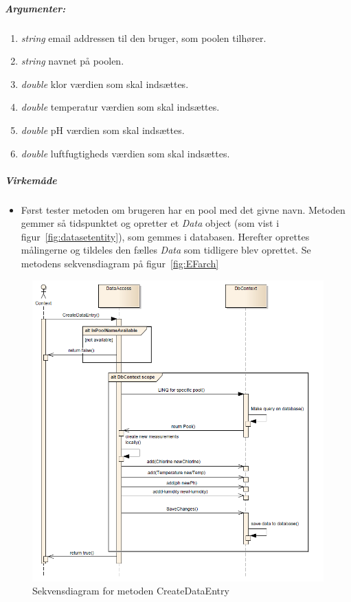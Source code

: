 \subparagraph{Argumenter:}
\begin{enumerate}
	\item \textit{string} email addressen til den bruger, som poolen tilhører.
	\item \textit{string} navnet på poolen.
	\item \textit{double} klor værdien som skal indsættes.
	\item \textit{double} temperatur værdien som skal indsættes.
	\item \textit{double} pH værdien som skal indsættes.
	\item \textit{double} luftfugtigheds værdien som skal indsættes.
\end{enumerate}

\subparagraph{Virkemåde}

\begin{itemize}
	\item Først tester metoden om brugeren har en pool med det givne navn. Metoden gemmer så tidspunktet og opretter et \textit{Data} object (som vist i figur~\ref{fig:datasetentity}), som gemmes i databasen. Herefter oprettes målingerne og tildeles den fælles \textit{Data} som tidligere blev oprettet. Se metodens sekvensdiagram på figur~\ref{fig:EFarch}
\end{itemize}

\begin{figure}[h]
\centering
\includegraphics[width=0.7\linewidth]{figs/dbSeq/createDataEntry.PNG}
\caption{Sekvensdiagram for metoden CreateDataEntry}
\label{fig:createDataEntry}
\end{figure}

